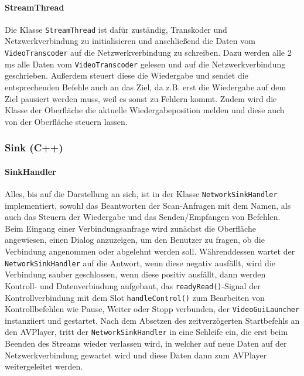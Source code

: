 \documentclass{article}
\begin{document}
    \paragraph{StreamThread}
    Die Klasse \texttt{StreamThread} ist dafür zuständig, Transkoder und Netzwerkverbindung zu initialisieren und
    anschließend die Daten vom \texttt{VideoTranscoder} auf die Netzwerkverbindung zu schreiben.
    Dazu werden alle 2 ms alle Daten vom \texttt{VideoTranscoder} gelesen und auf die Netzwerkverbindung geschrieben.
    Außerdem steuert diese die Wiedergabe und sendet die entsprechenden Befehle auch an das Ziel,
    da z.B. erst die Wiedergabe auf dem Ziel pausiert werden muss, weil es sonst zu Fehlern kommt.
    Zudem wird die Klasse der Oberfläche die aktuelle Wiedergabeposition melden und diese auch von der Oberfläche steuern lassen.

    \subsubsection{Sink (C++)}\label{subsubsec:sink-(c++)}

    \paragraph{SinkHandler}
    Alles, bis auf die Darstellung an sich, ist in der Klasse \texttt{NetworkSinkHandler} implementiert,
    sowohl das Beantworten der Scan-Anfragen mit dem Namen, als auch das Steuern der Wiedergabe und das Senden/Empfangen von Befehlen.
    Beim Eingang einer Verbindungsanfrage wird zunächst die Oberfläche angewiesen, einen Dialog anzuzeigen, um den Benutzer zu fragen,
    ob die Verbindung angenommen oder abgelehnt werden soll.
    Währenddessen wartet der \texttt{NetworkSinkHandler} auf die Antwort, wenn diese negativ ausfällt, wird die Verbindung sauber geschlossen,
    wenn diese positiv ausfällt, dann werden Kontroll- und Datenverbindung aufgebaut, das \texttt{readyRead()}-Signal der Kontrollverbindung mit
    dem Slot \texttt{handleControl()} zum Bearbeiten von Kontrollbefehlen wie Pause, Weiter oder Stopp verbunden, der \texttt{VideoGuiLauncher} instanziiert und gestartet.
    Nach dem Absetzen des zeitverzögerten Startbefehls an den AVPlayer, tritt der \texttt{NetworkSinkHandler} in eine Schleife ein,
    die erst beim Beenden des Streams wieder verlassen wird, in welcher auf neue Daten auf der Netzwerkverbindung gewartet wird
    und diese Daten dann zum AVPlayer weitergeleitet werden.
\end{document}
